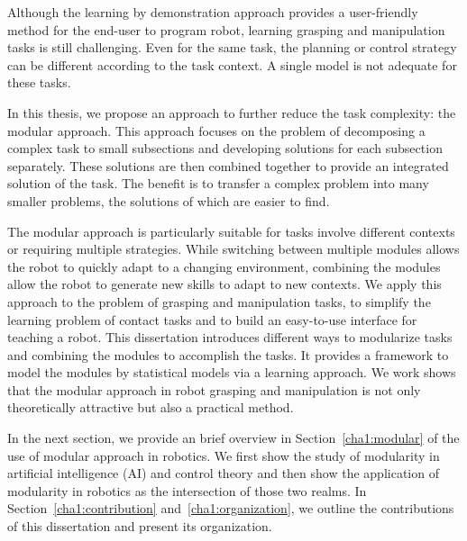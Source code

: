 Although the learning by demonstration approach provides a user-friendly method for the end-user to program robot, learning grasping and manipulation tasks is still challenging. Even for the same task, the planning or control strategy can be different according to the task context. A single model is not adequate for these tasks.


In this thesis, we propose an approach to further reduce the task complexity: the modular approach.
This approach focuses on the problem of decomposing a complex task to small subsections and developing solutions for each subsection separately. These solutions are then combined together to provide an integrated solution of the task. The benefit is to transfer a complex problem into many smaller problems, the solutions of which are easier to find.

The modular approach is particularly suitable for tasks involve different contexts or requiring multiple strategies. While switching between multiple modules allows the robot to quickly adapt to a changing environment, combining the modules allow the robot to generate new skills to adapt to new contexts. We apply this approach to the problem of grasping and manipulation tasks, to simplify the learning problem of contact tasks and to build an easy-to-use interface for teaching a robot. This dissertation introduces different ways to modularize tasks and combining the modules to accomplish the tasks. It provides a framework to model the modules by statistical models via a learning approach. We work shows that the modular approach in robot grasping and manipulation is not only theoretically attractive but also a practical method.

In the next section, we provide an brief overview in Section~\ref{cha1:modular} of the use of modular approach in robotics. We first show the study of modularity in artificial intelligence (AI) and control theory and then show the application of modularity in robotics as the intersection of those two realms. In Section~\ref{cha1:contribution} and~\ref{cha1:organization}, we outline the contributions of this dissertation and present its organization.


